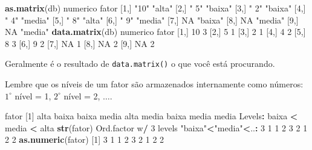 \documentclass[10pt,a4paper]{book}
\newenvironment{Shaded}{\begin{snugshade}}{\end{snugshade}}
\newcommand{\KeywordTok}[1]{\textcolor[rgb]{0.13,0.29,0.53}{\textbf{#1}}}
\newcommand{\DecValTok}[1]{\textcolor[rgb]{0.00,0.00,0.81}{#1}}
\newcommand{\StringTok}[1]{\textcolor[rgb]{0.31,0.60,0.02}{#1}}
\newcommand{\OtherTok}[1]{\textcolor[rgb]{0.56,0.35,0.01}{#1}}
\newcommand{\OperatorTok}[1]{\textcolor[rgb]{0.81,0.36,0.00}{\textbf{#1}}}
\newcommand{\NormalTok}[1]{#1}
\begin{document}
\begin{Shaded}
\begin{Highlighting}[]
\KeywordTok{as.matrix}\NormalTok{(db)}
\NormalTok{      numerico fator  }
\NormalTok{ [}\DecValTok{1}\NormalTok{,] }\StringTok{"10"}     \StringTok{"alta"} 
\NormalTok{ [}\DecValTok{2}\NormalTok{,] }\StringTok{" 5"}     \StringTok{"baixa"}
\NormalTok{ [}\DecValTok{3}\NormalTok{,] }\StringTok{" 2"}     \StringTok{"baixa"}
\NormalTok{ [}\DecValTok{4}\NormalTok{,] }\StringTok{" 4"}     \StringTok{"media"}
\NormalTok{ [}\DecValTok{5}\NormalTok{,] }\StringTok{" 8"}     \StringTok{"alta"} 
\NormalTok{ [}\DecValTok{6}\NormalTok{,] }\StringTok{" 9"}     \StringTok{"media"}
\NormalTok{ [}\DecValTok{7}\NormalTok{,] }\OtherTok{NA}       \StringTok{"baixa"}
\NormalTok{ [}\DecValTok{8}\NormalTok{,] }\OtherTok{NA}       \StringTok{"media"}
\NormalTok{ [}\DecValTok{9}\NormalTok{,] }\OtherTok{NA}       \StringTok{"media"}
\KeywordTok{data.matrix}\NormalTok{(db)}
\NormalTok{      numerico fator}
\NormalTok{ [}\DecValTok{1}\NormalTok{,]       }\DecValTok{10}     \DecValTok{3}
\NormalTok{ [}\DecValTok{2}\NormalTok{,]        }\DecValTok{5}     \DecValTok{1}
\NormalTok{ [}\DecValTok{3}\NormalTok{,]        }\DecValTok{2}     \DecValTok{1}
\NormalTok{ [}\DecValTok{4}\NormalTok{,]        }\DecValTok{4}     \DecValTok{2}
\NormalTok{ [}\DecValTok{5}\NormalTok{,]        }\DecValTok{8}     \DecValTok{3}
\NormalTok{ [}\DecValTok{6}\NormalTok{,]        }\DecValTok{9}     \DecValTok{2}
\NormalTok{ [}\DecValTok{7}\NormalTok{,]       }\OtherTok{NA}     \DecValTok{1}
\NormalTok{ [}\DecValTok{8}\NormalTok{,]       }\OtherTok{NA}     \DecValTok{2}
\NormalTok{ [}\DecValTok{9}\NormalTok{,]       }\OtherTok{NA}     \DecValTok{2}
\end{Highlighting}
\end{Shaded}

Geralmente é o resultado de \texttt{data.matrix()} o que você está
procurando.

Lembre que os níveis de um fator são armazenados internamente como
números: \(1^\circ\) nível = 1, \(2^\circ\) nível = 2, \(\ldots\).

\begin{Shaded}
\begin{Highlighting}[]
\NormalTok{fator}
\NormalTok{[}\DecValTok{1}\NormalTok{] alta  baixa baixa media alta  media baixa media media}
\NormalTok{Levels}\OperatorTok{:}\StringTok{ }\NormalTok{baixa }\OperatorTok{<}\StringTok{ }\NormalTok{media }\OperatorTok{<}\StringTok{ }\NormalTok{alta}
\KeywordTok{str}\NormalTok{(fator)}
\NormalTok{ Ord.factor w}\OperatorTok{/}\StringTok{ }\DecValTok{3}\NormalTok{ levels }\StringTok{"baixa"}\OperatorTok{<}\StringTok{"media"}\OperatorTok{<}\NormalTok{..}\OperatorTok{:}\StringTok{ }\DecValTok{3} \DecValTok{1} \DecValTok{1} \DecValTok{2} \DecValTok{3} \DecValTok{2} \DecValTok{1} \DecValTok{2} \DecValTok{2}
\KeywordTok{as.numeric}\NormalTok{(fator)}
\NormalTok{[}\DecValTok{1}\NormalTok{] }\DecValTok{3} \DecValTok{1} \DecValTok{1} \DecValTok{2} \DecValTok{3} \DecValTok{2} \DecValTok{1} \DecValTok{2} \DecValTok{2}
\end{Highlighting}
\end{Shaded}
\end{document}
